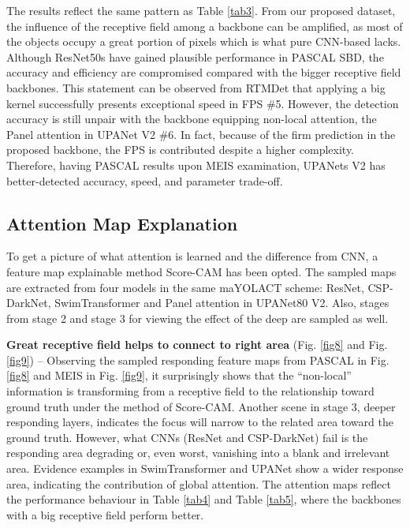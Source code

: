 \documentclass{article}
\begin{document}
The results reflect the same pattern as Table \ref{tab3}. From our proposed dataset, the influence of the receptive field among a backbone can be amplified, as most of the objects occupy a great portion of pixels which is what pure CNN-based lacks. Although ResNet50s have gained plausible performance in PASCAL SBD, the accuracy and efficiency are compromised compared with the bigger receptive field backbones. This statement can be observed from RTMDet that applying a big kernel successfully presents exceptional speed in FPS \#5. However, the detection accuracy is still unpair with the backbone equipping non-local attention, the Panel attention in UPANet V2 \#6. In fact, because of the firm prediction in the proposed backbone, the FPS is contributed despite a higher complexity. Therefore, having PASCAL results upon MEIS examination, UPANets V2 has better-detected accuracy, speed, and parameter trade-off. 

\subsection{Attention Map Explanation}
\label{sec5.3}
To get a picture of what attention is learned and the difference from CNN, a feature map explainable method Score-CAM \cite{wang2020score} has been opted. The sampled maps are extracted from four models in the same maYOLACT scheme: ResNet, CSP-DarkNet, SwimTransformer and Panel attention in UPANet80 V2. Also, stages from stage 2 and stage 3 for viewing the effect of the deep are sampled as well.

\textbf{Great receptive field helps to connect to right area} (Fig. \ref{fig8} and Fig. \ref{fig9}) – Observing the sampled responding feature maps from PASCAL in Fig. \ref{fig8} and MEIS in Fig. \ref{fig9}, it surprisingly shows that the “non-local” information is transforming from a receptive field to the relationship toward ground truth under the method of Score-CAM. Another scene in stage 3, deeper responding layers, indicates the focus will narrow to the related area toward the ground truth. However, what CNNs (ResNet and CSP-DarkNet) fail is the responding area degrading or, even worst, vanishing into a blank and irrelevant area. Evidence examples in SwimTransformer and UPANet show a wider response area, indicating the contribution of global attention. The attention maps reflect the performance behaviour in Table \ref{tab4} and Table \ref{tab5}, where the backbones with a big receptive field perform better. 
\end{document}
